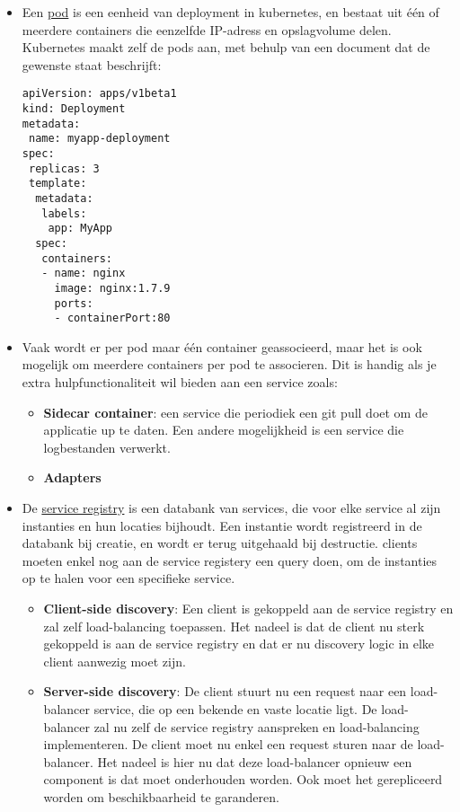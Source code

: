 \documentclass{report}
\begin{document}
\begin{itemize}
		\item[\info] Een \underline{pod} is een eenheid van deployment in kubernetes, en bestaat uit één of meerdere containers die eenzelfde IP-adress en opslagvolume delen. Kubernetes maakt zelf de pods aan, met behulp van een document dat de gewenste staat beschrijft:
		\begin{lstlisting}
apiVersion: apps/v1beta1
kind: Deployment
metadata:
 name: myapp-deployment
spec:
 replicas: 3
 template:
  metadata:
   labels:
	app: MyApp
  spec:
   containers:
   - name: nginx
	 image: nginx:1.7.9
	 ports:
	 - containerPort:80
		\end{lstlisting}

		\item[\info] Vaak wordt er per pod maar één container geassocieerd, maar het is ook mogelijk om meerdere containers per pod te associeren. Dit is handig als je extra hulpfunctionaliteit wil bieden aan een service zoals:
		\begin{itemize} 
			\item[\info] \textbf{Sidecar container}: een service die periodiek een git pull doet om de applicatie up te daten. Een andere mogelijkheid is een service die logbestanden verwerkt.
			\item[\info] \textbf{Adapters}      
		\end{itemize}

		\item[\info] De \underline{service registry} is een databank van services, die voor elke service al zijn instanties en hun locaties bijhoudt. Een instantie wordt registreerd in de databank bij creatie, en wordt er terug uitgehaald bij destructie. clients moeten enkel nog aan de service registery een query doen, om de instanties op te halen voor een specifieke service. 
		\begin{itemize}
			\item[\info] \textbf{Client-side discovery}: Een client is gekoppeld aan de service registry en zal zelf load-balancing toepassen. Het nadeel is dat de client nu sterk gekoppeld is aan de service registry en dat er nu discovery logic in elke client aanwezig moet zijn.
			\item[\info] \textbf{Server-side discovery}: De client stuurt nu een request naar een load-balancer service, die op een bekende en vaste locatie ligt. De load-balancer zal nu zelf de service registry aanspreken en load-balancing implementeren. De client moet nu enkel een request sturen naar de load-balancer. Het nadeel is hier nu dat deze load-balancer opnieuw een component is dat moet onderhouden worden. Ook moet het gerepliceerd worden om beschikbaarheid te garanderen.
		\end{itemize}


\end{itemize}
\end{document}

